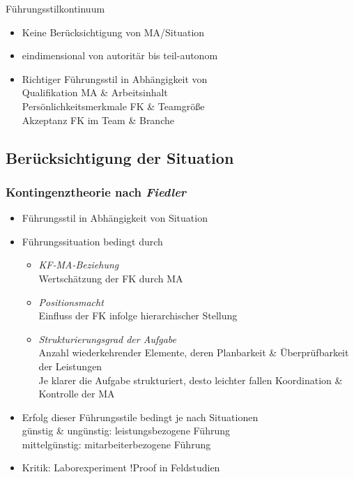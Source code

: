 \documentclass{cheatsheet}
\begin{document}
    \begin{sectionbox}{Führungsstilkontinuum}
        \begin{itemize}
            \item Keine Berücksichtigung von MA/Situation
            \item eindimensional von autoritär bis teil-autonom
            \item Richtiger Führungsstil in Abhängigkeit von\\
            \ra Qualifikation MA \& Arbeitsinhalt\\
            \ra Persönlichkeitsmerkmale FK \& Teamgröße\\
            \ra Akzeptanz FK im Team \& Branche
        \end{itemize}
    \end{sectionbox}
    \subsection{Berücksichtigung der Situation}
    \begin{normbox}{\subsubsection{Kontingenztheorie nach \emph{Fiedler}}}
        \begin{itemize}
            \item Führungsstil in Abhängigkeit von Situation
            \item Führungssituation bedingt durch
            \begin{itemize}
                \item \emph{KF-MA-Beziehung}\\
                \ra Wertschätzung der FK durch MA
                \item \emph{Positionsmacht}\\
                \ra Einfluss der FK infolge hierarchischer Stellung
                \item \emph{Strukturierungsgrad der Aufgabe}\\
                \ra Anzahl wiederkehrender Elemente, deren Planbarkeit \& Überprüfbarkeit der Leistungen\\
                \ra Je klarer die Aufgabe strukturiert, desto leichter fallen Koordination \& Kontrolle der MA
            \end{itemize}
            \item Erfolg dieser Führungsstile bedingt je nach Situationen\\
            \ra günstig \& ungünstig: leistungsbezogene Führung\\
            \ra mittelgünstig: mitarbeiterbezogene Führung
            \item Kritik: Laborexperiment \rightleftharpoons !Proof in Feldstudien
        \end{itemize}
    \end{normbox}
\end{document}
